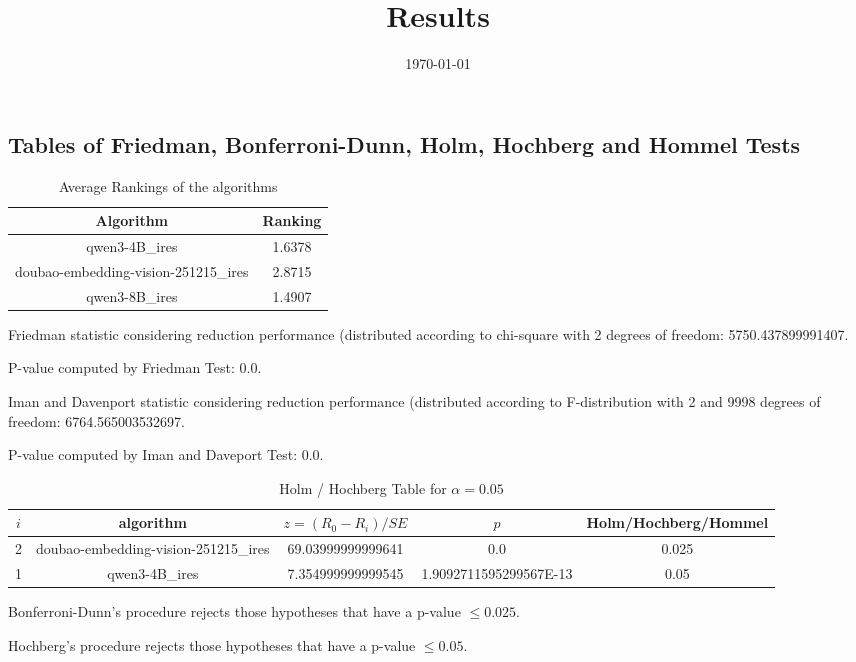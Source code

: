 \documentclass[a4paper,10pt]{article}
\title{Results}
\date{\today}
\begin{document}
\begin{landscape}
\oddsidemargin 0in \topmargin 0in\maketitle
\section{Tables of Friedman, Bonferroni-Dunn, Holm, Hochberg and Hommel Tests}
\begin{table}[!htp]
\centering
\caption{Average Rankings of the algorithms
}\begin{tabular}{c|c}
Algorithm&Ranking\\
\hline
qwen3-4B_ires&1.6378\\
doubao-embedding-vision-251215_ires&2.8715\\
qwen3-8B_ires&1.4907\\
\end{tabular}
\end{table}


Friedman statistic considering reduction performance (distributed according to chi-square with 2 degrees of freedom: 5750.437899991407.


P-value computed by Friedman Test: 0.0.\newline

Iman and Davenport statistic considering reduction performance (distributed according to F-distribution with 2 and 9998 degrees of freedom: 6764.565003532697.


P-value computed by Iman and Daveport Test: 0.0.\newline

\begin{table}[!htp]
\centering\tiny
\caption{Holm / Hochberg Table for $\alpha=0.05$}
\begin{tabular}{ccccc}
$i$&algorithm&$z=(R_0 - R_i)/SE$&$p$&Holm/Hochberg/Hommel\\
\hline
2&doubao-embedding-vision-251215_ires&69.03999999999641&0.0&0.025\\
1&qwen3-4B_ires&7.354999999999545&1.9092711595299567E-13&0.05\\
\hline
\end{tabular}
\end{table}
Bonferroni-Dunn's procedure rejects those hypotheses that have a p-value $\le0.025$.


Hochberg's procedure rejects those hypotheses that have a p-value $\le0.05$.



\end{landscape}
\end{document}

